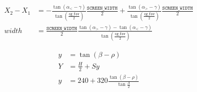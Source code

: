 \begin{align*}
X_2 - X_1 &= - \frac{\tan(\alpha_{<}-\gamma)}{\tan\left(\frac{\texttt{cg\_fov}}{2}\right)} \frac{\texttt{SCREEN\_WIDTH}}{2} + \frac{\tan(\alpha_{>}-\gamma)}{\tan\left(\frac{\texttt{cg\_fov}}{2}\right)} \frac{\texttt{SCREEN\_WIDTH}}{2}\\
width &= \frac{\texttt{SCREEN\_WIDTH}}{2} \frac{\tan(\alpha_{>}-\gamma) - \tan(\alpha_{<}-\gamma)}{\tan\left(\frac{\texttt{cg\_fov}}{2}\right)}
\end{align*}

\begin{align*}
y &= \tan(\beta-\rho)\\
Y &= \frac{H}{2} + Sy\\
y &= 240 + 320\frac{\tan(\beta-\rho)}{\tan\frac{\Lambda}{2}}
\end{align*}
